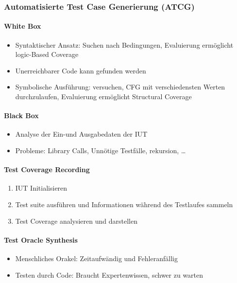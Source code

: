 \documentclass[
    ngerman,
    color=3b,
    summary,
    boxarc,
    main,
]{rubos-tuda-template}
\begin{document}
\subsubsection{Automatisierte Test Case Generierung (ATCG)}
\paragraph{White Box}\begin{itemize}
    \item Syntaktischer Ansatz: Suchen nach Bedingungen, Evaluierung ermöglicht logic-Based Coverage
    \item Unerreichbarer Code kann gefunden werden
    \item Symbolische Ausführung: versuchen, CFG mit verschiedensten Werten durchzulaufen, Evaluierung ermöglicht Structural Coverage
\end{itemize}
\vspace*{-1ex}
\paragraph{Black Box}\begin{itemize}
    \item Analyse der Ein-und Ausgabedaten der IUT
    \item Probleme: Library Calls, Unnötige Testfälle, rekursion, \dots
\end{itemize}
\vspace*{-1ex}
\paragraph{Test Coverage Recording}\begin{enumerate}
    \item IUT Initialisieren
    \item Test suite ausführen und Informationen während des Testlaufes sammeln
    \item Test Coverage analysieren und darstellen
\end{enumerate}
\vspace*{-1ex}
\paragraph{Test Oracle Synthesis}\begin{itemize}
    \item Menschliches Orakel: Zeitaufwändig und Fehleranfällig
    \item Testen durch Code: Braucht Expertenwissen, schwer zu warten
\end{itemize}
\vspace*{-1ex}
\end{document}
